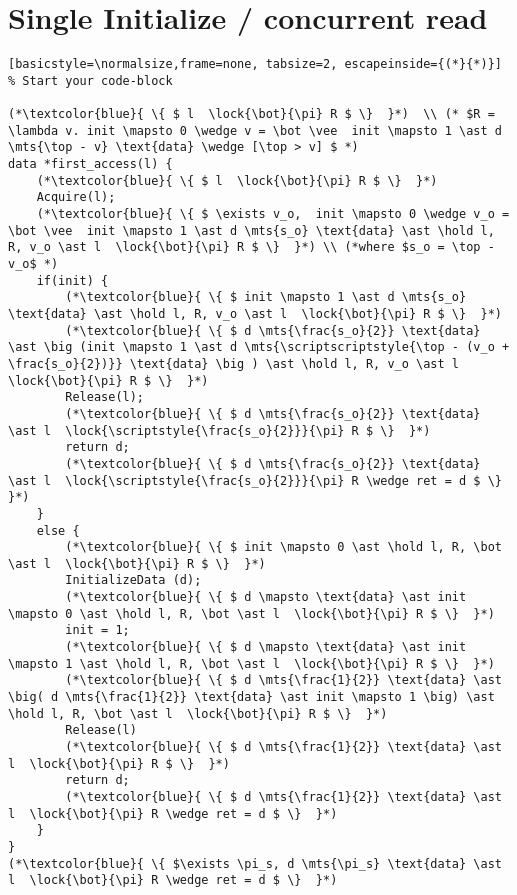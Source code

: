 \documentclass[8pt]{article}
\newcommand{\lock}[2]{ \square \hspace{-1ex} \xrightarrow[#1]{#2}}
\newcommand{\hold}{\text{Hold }}
\newcommand{\mts}[1]{ \overset{#1}{\mapsto} }
\begin{document}
\section{Single Initialize / concurrent read  }
\begin{lstlisting}[basicstyle=\normalsize,frame=none, tabsize=2, escapeinside={(*}{*)}]  % Start your code-block

(*\textcolor{blue}{ \{ $ l  \lock{\bot}{\pi} R $ \}  }*)  \\ (* $R = \lambda v. init \mapsto 0 \wedge v = \bot \vee  init \mapsto 1 \ast d \mts{\top - v} \text{data} \wedge [\top > v] $ *)
data *first_access(l) {
	(*\textcolor{blue}{ \{ $ l  \lock{\bot}{\pi} R $ \}  }*)  
	Acquire(l);
	(*\textcolor{blue}{ \{ $ \exists v_o,  init \mapsto 0 \wedge v_o = \bot \vee  init \mapsto 1 \ast d \mts{s_o} \text{data} \ast \hold l, R, v_o \ast l  \lock{\bot}{\pi} R $ \}  }*) \\ (*where $s_o = \top -v_o$ *)
	if(init) {
		(*\textcolor{blue}{ \{ $ init \mapsto 1 \ast d \mts{s_o} \text{data} \ast \hold l, R, v_o \ast l  \lock{\bot}{\pi} R $ \}  }*) 
		(*\textcolor{blue}{ \{ $ d \mts{\frac{s_o}{2}} \text{data} \ast \big (init \mapsto 1 \ast d \mts{\scriptscriptstyle{\top - (v_o + \frac{s_o}{2})}} \text{data} \big ) \ast \hold l, R, v_o \ast l  \lock{\bot}{\pi} R $ \}  }*) 
		Release(l);
		(*\textcolor{blue}{ \{ $ d \mts{\frac{s_o}{2}} \text{data} \ast l  \lock{\scriptstyle{\frac{s_o}{2}}}{\pi} R $ \}  }*) 
		return d;
		(*\textcolor{blue}{ \{ $ d \mts{\frac{s_o}{2}} \text{data} \ast l  \lock{\scriptstyle{\frac{s_o}{2}}}{\pi} R \wedge ret = d $ \}  }*) 
	}	
	else {
		(*\textcolor{blue}{ \{ $ init \mapsto 0 \ast \hold l, R, \bot \ast l  \lock{\bot}{\pi} R $ \}  }*) 
		InitializeData (d);
		(*\textcolor{blue}{ \{ $ d \mapsto \text{data} \ast init \mapsto 0 \ast \hold l, R, \bot \ast l  \lock{\bot}{\pi} R $ \}  }*) 
		init = 1;
		(*\textcolor{blue}{ \{ $ d \mapsto \text{data} \ast init \mapsto 1 \ast \hold l, R, \bot \ast l  \lock{\bot}{\pi} R $ \}  }*) 
		(*\textcolor{blue}{ \{ $ d \mts{\frac{1}{2}} \text{data} \ast \big( d \mts{\frac{1}{2}} \text{data} \ast init \mapsto 1 \big) \ast \hold l, R, \bot \ast l  \lock{\bot}{\pi} R $ \}  }*) 
		Release(l)
		(*\textcolor{blue}{ \{ $ d \mts{\frac{1}{2}} \text{data} \ast l  \lock{\bot}{\pi} R $ \}  }*) 
		return d;
		(*\textcolor{blue}{ \{ $ d \mts{\frac{1}{2}} \text{data} \ast l  \lock{\bot}{\pi} R \wedge ret = d $ \}  }*) 
	}
}
(*\textcolor{blue}{ \{ $\exists \pi_s, d \mts{\pi_s} \text{data} \ast l  \lock{\bot}{\pi} R \wedge ret = d $ \}  }*) 

\end{lstlisting}
\end{document}
